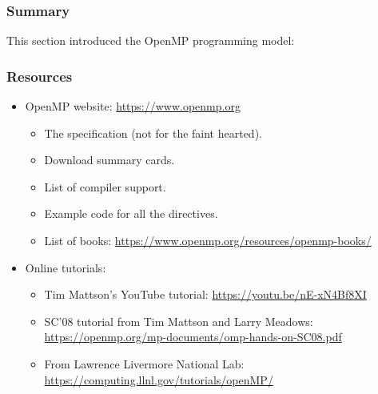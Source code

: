 \documentclass{beamer}
\begin{document}
\begin{frame}
\frametitle{Summary}
This section introduced the OpenMP programming model:
\end{frame}

\begin{frame}
\frametitle{Resources}
\begin{itemize}
\item OpenMP website: \url{https://www.openmp.org}
  \begin{itemize}
    \item The specification (not for the faint hearted).
    \item Download summary cards.
    \item List of compiler support.
    \item Example code for all the directives.
    \item List of books: \url{https://www.openmp.org/resources/openmp-books/}
  \end{itemize}

\item Online tutorials:
  \begin{itemize}
    \item Tim Mattson's YouTube tutorial: \url{https://youtu.be/nE-xN4Bf8XI}
    \item SC'08 tutorial from Tim Mattson and Larry Meadows: \url{https://openmp.org/mp-documents/omp-hands-on-SC08.pdf}
    \item From Lawrence Livermore National Lab: \url{https://computing.llnl.gov/tutorials/openMP/}
  \end{itemize}

\end{itemize}

\end{frame}

\end{document}
